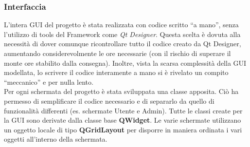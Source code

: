 \documentclass[a4paper,10pt] {article}
\begin{document}
\subsubsection{Interfaccia}
L'intera GUI del progetto è stata realizzata con codice scritto ``a mano'', senza l'utilizzo di tools del Framework come \textsl{Qt Designer}.
Questa scelta è dovuta alla necessità di dover comunque ricontrollare tutto il codice creato da Qt Designer, aumentando considerevolmente
le ore necessarie (con il rischio di superare il monte ore stabilito dalla consegna). Inoltre, vista la scarsa complessità della GUI modellata, lo scrivere
il codice interamente a mano si è rivelato un compito ``meccanico'' e per nulla lento. \\
Per ogni schermata del progetto è stata sviluppata una classe apposita. Ciò ha permesso di semplificare il codice necessario e di separarlo da quello di funzionalità
differenti (es. schermate Utente e Admin). Tutte le classi create per la GUI sono derivate dalla classe base \textbf{QWidget}. Le varie schermate utilizzano
un oggetto locale di tipo \textbf{QGridLayout} per disporre in maniera ordinata i vari oggetti all'interno della schermata.
\end{document}
